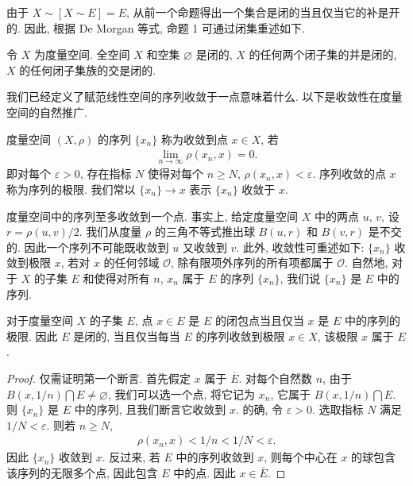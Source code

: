 \documentclass[../../main.tex]{subfiles}
\begin{document}
由于 $X\sim[X\sim E]=E$, 从前一个命题得出一个集合是闭的当且仅当它的补是开的. 因此, 根据 De Morgan 等式, 命题 1 可通过闭集重述如下.

\begin{proposition}\label{proposition:ch09-闭集运算}
令 $X$ 为度量空间. 全空间 $X$ 和空集 $\varnothing $ 是闭的, $X$ 的任何两个闭子集的并是闭的, $X$ 的任何闭子集族的交是闭的.
\end{proposition}

我们已经定义了赋范线性空间的序列收敛于一点意味着什么. 以下是收敛性在度量空间的自然推广.

\begin{definition}[序列收敛]\label{definition:ch09-序列收敛}
度量空间 $(X,\rho)$ 的序列 $\{x_{n}\}$ 称为收敛到点 $x\in X$, 若
\begin{align*}
\lim_{n\to\infty}\rho(x_{n},x)=0.
\end{align*}
即对每个 $\varepsilon>0$, 存在指标 $N$ 使得对每个 $n\geqslant N$, $\rho(x_{n},x)<\varepsilon$. 序列收敛的点 $x$ 称为序列的极限. 我们常以 $\{x_{n}\}\to x$ 表示 $\{x_{n}\}$ 收敛于 $x$.
\end{definition}

度量空间中的序列至多收敛到一个点. 事实上, 给定度量空间 $X$ 中的两点 $u$, $v$, 设 $r=\rho(u,v)/2$. 我们从度量 $\rho$ 的三角不等式推出球 $B(u,r)$ 和 $B(v,r)$ 是不交的. 因此一个序列不可能既收敛到 $u$ 又收敛到 $v$. 此外, 收敛性可重述如下: $\{x_{n}\}$ 收敛到极限 $x$, 若对 $x$ 的任何邻域 $\mathcal{O}$, 除有限项外序列的所有项都属于 $\mathcal{O}$. 自然地, 对于 $X$ 的子集 $E$ 和使得对所有 $n$, $x_{n}$ 属于 $E$ 的序列 $\{x_{n}\}$, 我们说 $\{x_{n}\}$ 是 $E$ 中的序列.

\begin{proposition}\label{proposition:ch09-闭包点序列极限}
对于度量空间 $X$ 的子集 $E$, 点 $x\in E$ 是 $E$ 的闭包点当且仅当 $x$ 是 $E$ 中的序列的极限. 因此 $E$ 是闭的, 当且仅当每当 $E$ 的序列收敛到极限 $x\in X$, 该极限 $x$ 属于 $E$.
\end{proposition}

\begin{proof}
仅需证明第一个断言. 首先假定 $x$ 属于 $\overline{E}$. 对每个自然数 $n$, 由于 $B(x,1/n)\bigcap E\neq\varnothing $, 我们可以选一个点, 将它记为 $x_{n}$, 它属于 $B(x,1/n)\bigcap E$. 则 $\{x_{n}\}$ 是 $E$ 中的序列, 且我们断言它收敛到 $x$. 的确, 令 $\varepsilon>0$. 选取指标 $N$ 满足 $1/N<\varepsilon$. 则若 $n\geqslant N$,
\begin{align*}
\rho(x_{n},x)<1/n<1/N<\varepsilon.
\end{align*}
因此 $\{x_{n}\}$ 收敛到 $x$. 反过来, 若 $E$ 中的序列收敛到 $x$, 则每个中心在 $x$ 的球包含该序列的无限多个点, 因此包含 $E$ 中的点. 因此 $x\in\overline{E}$.
\end{proof}
\end{document}
